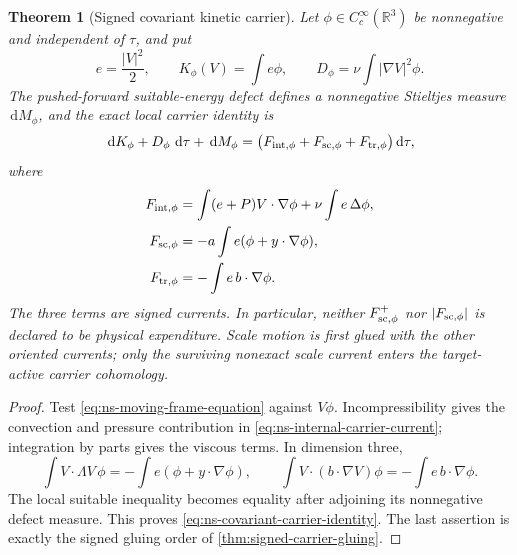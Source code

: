 \documentclass[11pt]{article}
\numberwithin{section}{part}
\theoremstyle{plain}
\newtheorem{theorem}{Theorem}[section]
\theoremstyle{definition}
\theoremstyle{remark}
\newcommand{\dd}{\,\mathrm d}
\begin{document}
\begin{theorem}[Signed covariant kinetic carrier]
\label{thm:ns-signed-covariant-carrier}
Let \(\phi\in C_c^\infty(\mathbb R^3)\) be nonnegative and independent of
\(\tau\), and put
\[
 e=\frac{|V|^2}{2},\qquad K_\phi(V)=\int e\phi,
 \qquad
 D_\phi=\nu\int |\nabla V|^2\phi.
\]
The pushed-forward suitable-energy defect defines a nonnegative Stieltjes
measure \(\dd M_\phi\), and the exact local carrier identity is
\begin{equation}
 \label{eq:ns-covariant-carrier-identity}
 \dd K_\phi+D_\phi\,\dd\tau+\dd M_\phi
 =\bigl(F_{\rm int,\phi}+F_{\rm sc,\phi}
       +F_{\rm tr,\phi}\bigr)\dd\tau,
\end{equation}
where
\begin{align}
 F_{\rm int,\phi}
  &=\int(e+P)V\cdot\nabla\phi
    +\nu\int e\,\Delta\phi,\label{eq:ns-internal-carrier-current}\\
 F_{\rm sc,\phi}
  &=-a\int e(\phi+y\cdot\nabla\phi),
  \label{eq:ns-scale-carrier-current}\\
 F_{\rm tr,\phi}
  &=-\int e\,b\cdot\nabla\phi.
  \label{eq:ns-translation-carrier-current}
\end{align}
The three terms are signed currents.  In particular, neither
\(F_{\rm sc,\phi}^{+}\) nor \(|F_{\rm sc,\phi}|\) is declared to be physical
expenditure.  Scale motion is first glued with the other oriented currents;
only the surviving nonexact scale current enters the target-active carrier
cohomology.
\end{theorem}

\begin{proof}
Test \eqref{eq:ns-moving-frame-equation} against \(V\phi\).  Incompressibility
gives the convection and pressure contribution in
\eqref{eq:ns-internal-carrier-current}; integration by parts gives the
viscous terms.  In dimension three,
\[
 \int V\cdot\Lambda V\,\phi
 =-\int e(\phi+y\cdot\nabla\phi),
 \qquad
 \int V\cdot(b\cdot\nabla V)\phi
 =-\int e\,b\cdot\nabla\phi.
\]
The local suitable inequality becomes equality after adjoining its
nonnegative defect measure.  This proves
\eqref{eq:ns-covariant-carrier-identity}.  The last assertion is exactly the
signed gluing order of \cref{thm:signed-carrier-gluing}.
\end{proof}
\end{document}
